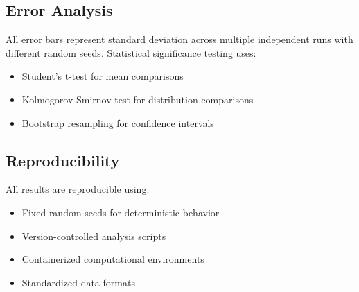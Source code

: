 \documentclass[twocolumn,showpacs,preprintnumbers,amsmath,amssymb,prb]{revtex4-2}
\begin{document}
\subsection{Error Analysis}
All error bars represent standard deviation across multiple independent runs with different random seeds. Statistical significance testing uses:
\begin{itemize}
\item Student's t-test for mean comparisons
\item Kolmogorov-Smirnov test for distribution comparisons
\item Bootstrap resampling for confidence intervals
\end{itemize}

\subsection{Reproducibility}
All results are reproducible using:
\begin{itemize}
\item Fixed random seeds for deterministic behavior
\item Version-controlled analysis scripts
\item Containerized computational environments
\item Standardized data formats
\end{itemize}
\end{document}
